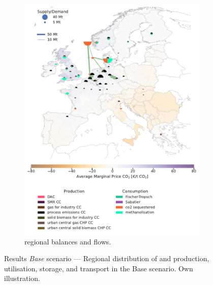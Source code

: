 \documentclass[final,5p,times,twocolumn]{elsarticle}
\begin{document}
\begin{figure}[t]
\begin{subfigure}[t]{0.47\textwidth}
      \includegraphics[width=\textwidth]{balance_map_co2_base} %
      \caption{ regional balances and flows.}
      \label{fig:balance_map_co2_base}
  \end{subfigure}
  \caption{Results \textit{Base} scenario --- Regional distribution of  and  production, utilisation, storage, and transport in the Base scenario. Own illustration.}
  \label{fig:balance_maps_base}
\end{figure}
\end{document}
